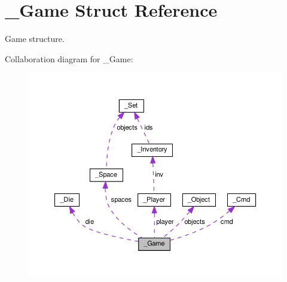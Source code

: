 \hypertarget{struct__Game}{}\section{\+\_\+\+Game Struct Reference}
\label{struct__Game}


Game structure.  




Collaboration diagram for \+\_\+\+Game\+:
\nopagebreak
\begin{figure}[H]
\begin{center}
\leavevmode
\includegraphics[width=350pt]{struct__Game__coll__graph}
\end{center}
\end{figure}
